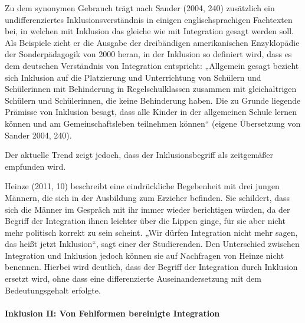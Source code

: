 Zu dem synonymen Gebrauch trägt nach Sander (2004, 240) zusätzlich ein undifferenziertes Inklusionsverständnis in einigen englischsprachigen Fachtexten bei, in welchen mit Inklusion das gleiche wie mit Integration gesagt werden soll. Als Beispiele zieht er die Ausgabe der dreibändigen amerikanischen Enzyklopädie der Sonderpädagogik von 2000 heran, in der Inklusion so definiert wird, dass es dem deutschen Verständnis von Integration entspricht: „Allgemein gesagt bezieht sich Inklusion auf die Platzierung und Unterrichtung von Schülern und Schülerinnen mit Behinderung in Regelschulklassen zusammen mit gleichaltrigen Schülern und Schülerinnen, die keine Behinderung haben. Die zu Grunde liegende Prämisse von Inklusion besagt, dass alle Kinder in der allgemeinen Schule lernen können und am Gemeinschaftsleben teilnehmen können“ (eigene Übersetzung von Sander 2004, 240). 
 
Der aktuelle Trend zeigt jedoch, dass der Inklusionsbegriff als zeitgemäßer empfunden wird. 

Heinze (2011, 10) beschreibt eine eindrückliche Begebenheit mit drei jungen Männern, die sich in der Ausbildung zum Erzieher befinden. Sie schildert, dass sich die Männer im Gespräch mit ihr immer wieder berichtigen würden, da der Begriff der Integration ihnen leichter über die Lippen ginge, für sie aber nicht mehr politisch korrekt zu sein scheint. „Wir dürfen Integration nicht mehr sagen, das heißt jetzt Inklusion“, sagt einer der Studierenden. Den Unterschied zwischen Integration und Inklusion jedoch können sie auf Nachfragen von Heinze nicht benennen. Hierbei wird deutlich, dass der Begriff der Integration durch Inklusion ersetzt wird, ohne dass eine differenzierte Auseinandersetzung mit dem Bedeutungsgehalt erfolgte. 

\paragraph{Inklusion II: Von Fehlformen bereinigte Integration} 

